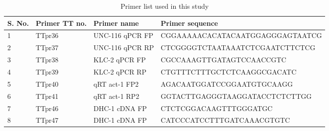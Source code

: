 \begin{appendices}
	\begin{table}[H]\centering
		\caption{Primer list used in this study}\label{tab:PrimerlistB}
		\scriptsize
		\begin{tabularx}{1\textwidth}{@{} l l l l @{}}\toprule
			S. No. &Primer TT no. &Primer name &Primer sequence \\\midrule
			1 &TTpr36 &UNC-116 qPCR FP &CGGAAAAACACATACAATGGAGGGAGTAATCG \\
			2 &TTpr37 &UNC-116 qPCR RP &CTCGGGGTCTAATAAATCTCGAATCTTCTCG \\
			3 &TTpr38 &KLC-2 qPCR FP &CGCCAAAGTTGATAGTCCAACCGTC \\
			4 &TTpr39 &KLC-2 qPCR RP &CTGTTTCTTTGCTCTCAAGGCGACATC \\
			5 &TTpr40 &qRT act-1 FP2 &AGACAATGGATCCGGAATGTGCAAGG \\
			6 &TTpr41 &qRT act-1 RP2 &GGTACTTGAGGGTAAGGATACCTCTCTTGG \\
			7 &TTpr46 &DHC-1 cDNA FP &CTCTCGGACAAGTTTGGGATGC \\
			8 &TTpr47 &DHC-1 cDNA FP &CATCCCATCCTTTGATCAAACGTGTC \\
			\bottomrule
		\end{tabularx}
	\end{table}
	
\end{appendices}
